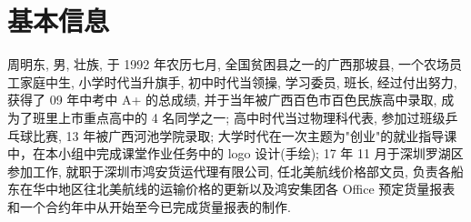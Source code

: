 \section{基本信息}
周明东, 男, 壮族, 于 1992 年农历七月, 全国贫困县之一的广西那坡县, 一个农场员工家庭中生, 小学时代当升旗手, 初中时代当领操, 学习委员, 班长, 经过付出努力, 获得了 09 年中考中 A+ 的总成绩, 并于当年被广西百色市百色民族高中录取, 成为了班里上市重点高中的 4 名同学之一; 高中时代当过物理科代表, 参加过班级乒乓球比赛, 13 年被广西河池学院录取; 大学时代在一次主题为"创业"的就业指导课中，在本小组中完成课堂作业任务中的 logo 设计(手绘); 17 年 11 月于深圳罗湖区参加工作, 就职于深圳市鸿安货运代理有限公司, 任北美航线价格部文员, 负责各船东在华中地区往北美航线的运输价格的更新以及鸿安集团各 Office 预定货量报表和一个合约年中从开始至今已完成货量报表的制作. 
